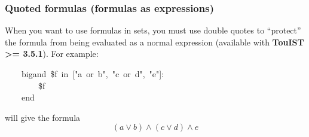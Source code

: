 {\subsubsection{Quoted formulas (formulas as expressions)}\label{quoted-formulas}%

\noindent When you want to use formulas in sets, you must use double quotes 
to \textquotedblleft{}protect\textquotedblright{} the formula from being evaluated as a normal expression
(available with \textbf{TouIST \textgreater{}= 3.5.1}). For example:%
\begin{mdpre}%
\noindent~~~~{bigand}~{\$f}~{in}~{}["a~or~b",~"c~or~d",~"e"]:\\
~~~~~~~~{\$f}\\
~~~~{end}%
\end{mdpre}\noindent will give the formula
\noindent\noindent\[(a \vee b) \wedge (c \vee d) \wedge e
\]%

} %